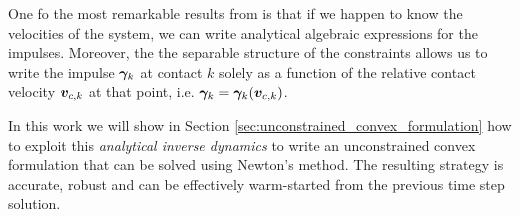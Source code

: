 One fo the most remarkable results from \cite{bib:todorov2014} is that if we
 happen to know the velocities of the system, we can write analytical algebraic
 expressions for the impulses. Moreover, the the separable structure of the
 constraints allows us to write the impulse ${\bm\gamma}_k$ at contact $k$ solely as
 a function of the relative contact velocity ${\bm{v}}_{c,k}$ at that point, i.e.
 ${\bm\gamma}_k = {\bm\gamma}_k({\bm{v}}_{c,k})$.

In this work we will show in Section \ref{sec:unconstrained_convex_formulation}
how to exploit this \textit{analytical inverse dynamics} to write an
unconstrained convex formulation that can be solved using Newton's method. The
resulting strategy is accurate, robust and can be effectively warm-started from
the previous time step solution.
